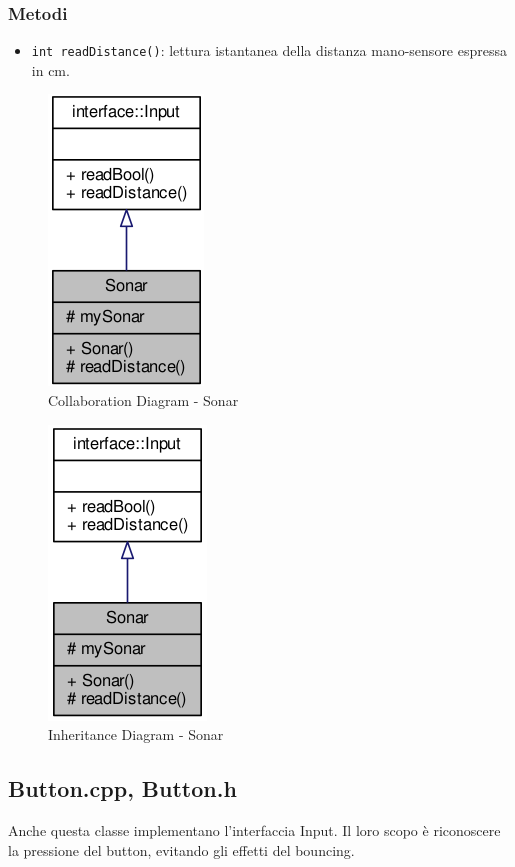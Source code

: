 \subsubsection{Metodi}
\begin{itemize}
	\item \texttt{int readDistance()}: lettura istantanea della distanza mano-sensore espressa in cm.
\end{itemize}
\begin{figure}[!ht]
	\centering
	\includegraphics[scale=.5]{img/UML/CollaborationDiagram/Sonar.png}
	\caption{Collaboration Diagram - Sonar}
\end{figure}
\begin{figure}[!ht]
	\centering
	\includegraphics[scale=.5]{img/UML/InheritanceDiagram/Sonar.png}
	\caption{Inheritance Diagram - Sonar}
\end{figure}

\newpage
\subsection{Button.cpp, Button.h}
Anche questa classe implementano l'interfaccia Input. Il loro scopo è riconoscere la pressione del button, evitando gli effetti del bouncing.

